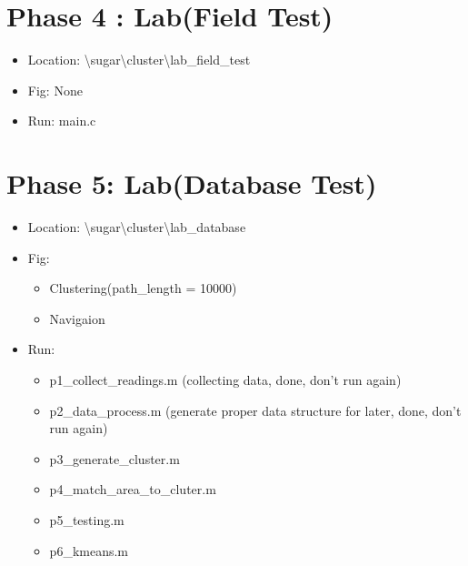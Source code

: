 \documentclass{article}
\begin{document}
\section{Phase 4 : Lab(Field Test)}
\begin{itemize}
\item Location: \textbackslash sugar\textbackslash cluster\textbackslash lab\_field\_test
\item Fig: None
\item Run: main.c
\end{itemize}


\section{Phase 5: Lab(Database Test)}
\begin{itemize}
\item Location: \textbackslash sugar\textbackslash cluster\textbackslash lab\_database
\item Fig: 
	\begin{itemize}
	\item Clustering(path\_length = 10000) 
	\item Navigaion
	\end{itemize}
\item Run:
	\begin{itemize}
	\item p1\_collect\_readings.m (collecting data, done, don't run again)
	\item p2\_data\_process.m (generate proper data structure for later, done, don't run again)
	\item p3\_generate\_cluster.m 
	\item p4\_match\_area\_to\_cluter.m 
	\item p5\_testing.m
	\item p6\_kmeans.m
	\end{itemize}
\end{itemize}
\end{document}
